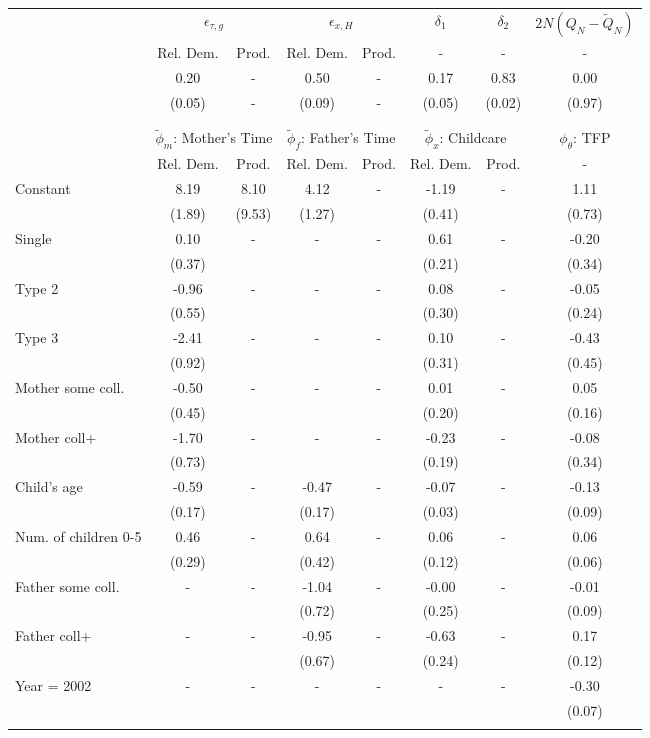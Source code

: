 \begin{tabular}{lccccccc}\toprule
 & \multicolumn{2}{c}{$\epsilon_{\tau,g}$} & \multicolumn{2}{c}{$\epsilon_{x,H}$} & {$\delta_{1}$} & {$\delta_{2}$} & $2N(Q_{N} - \tilde{Q}_{N})$ \\
 & Rel. Dem. & Prod. & Rel. Dem. & Prod. & - & - & - \\\cmidrule(r){2-3}\cmidrule(r){4-5}\cmidrule(r){6-6}\cmidrule(r){7-7}\cmidrule(r){8-8}
&0.20& - &0.50& - &0.17&0.83&0.00\\
&(0.05)& - &(0.09)& - &(0.05)&(0.02)&(0.97)\\
\\
&&&&&&&\\
 & \multicolumn{2}{c}{$\tilde{\phi}_{m}$: Mother's Time} & \multicolumn{2}{c}{$\tilde{\phi}_{f}$: Father's Time} & \multicolumn{2}{c}{$\tilde{\phi}_{x}$: Childcare} &{$\phi_{\theta}$: TFP} \\
 & Rel. Dem. & Prod. & Rel. Dem. & Prod. & Rel. Dem. & Prod. & -  \\\cmidrule(r){2-3}\cmidrule(r){4-5}\cmidrule(r){6-7}\cmidrule(r){8-8}
Constant&8.19&8.10&4.12& -&-1.19& -&1.11\\
&(1.89)&(9.53)&(1.27)&&(0.41)&&(0.73)\\
Single&0.10& -& - & -&0.61& -&-0.20\\
&(0.37)& & &&(0.21)&&(0.34)\\
Type 2&-0.96& -& - & -&0.08& -&-0.05\\
&(0.55)& & &&(0.30)&&(0.24)\\
Type 3&-2.41& -& - & -&0.10& -&-0.43\\
&(0.92)& & &&(0.31)&&(0.45)\\
Mother some coll.&-0.50& -& - & -&0.01& -&0.05\\
&(0.45)& & &&(0.20)&&(0.16)\\
Mother coll+&-1.70& -& - & -&-0.23& -&-0.08\\
&(0.73)& & &&(0.19)&&(0.34)\\
Child's age&-0.59& -&-0.47& -&-0.07& -&-0.13\\
&(0.17)&&(0.17)&&(0.03)&&(0.09)\\
Num. of children 0-5&0.46& -&0.64& -&0.06& -&0.06\\
&(0.29)&&(0.42)&&(0.12)&&(0.06)\\
Father some coll.& - & -&-1.04& -&-0.00& -&-0.01\\
 & &&(0.72)&&(0.25)&&(0.09)\\
Father coll+& - & -&-0.95& -&-0.63& -&0.17\\
 & &&(0.67)&&(0.24)&&(0.12)\\
Year = 2002& - & -& - & -& - & -&-0.30\\
 & & & & & &&(0.07)\\
\\
\bottomrule\end{tabular}